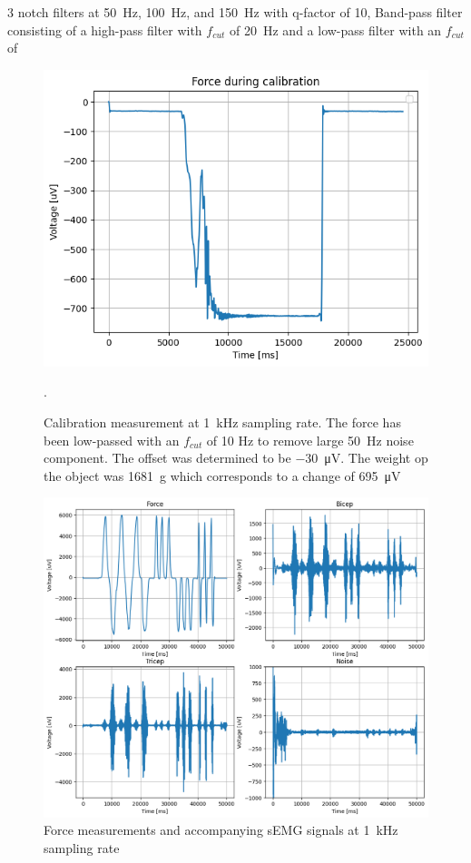 3 notch filters at \SI{50}{\hertz}, \SI{100}{\hertz}, and \SI{150}{\hertz}  with q-factor of 10, Band-pass filter consisting of a high-pass filter with $f_{cut}$ of \SI{20}{\hertz} and a low-pass filter with an $f_{cut}$ of


\begin{figure}[h!t]
	\begin{center}
		\includegraphics[width=0.8\columnwidth]{images/measurement_calibratie3_1k.png}
	\end{center}
	\caption{Calibration measurement at \SI{1}{\kilo\hertz} sampling rate. The force has been low-passed with an $f_{cut}$ of 10 Hz to remove large \SI{50}{\hertz} noise component. The offset was determined to be \SI{-30}{\micro\volt}. The weight op the object was \SI{1681}{\gram} which corresponds to a change of \SI{695}{\micro\volt}}.
	\label{fig:calibration_1k}
\end{figure}

\begin{figure}[h!t]
	\begin{center}
		\includegraphics[width=1.0\columnwidth]{images/measurement_meting3_1k.png}
	\end{center}
	\caption{Force measurements and accompanying sEMG signals at \SI{1}{\kilo\hertz} sampling rate}
	\label{fig:measurement_1k}
\end{figure}

